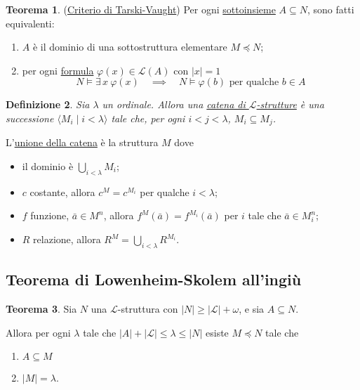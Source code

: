 \documentclass[10pt]{article}
\newcommand{\1}{\mathds{1}}
\theoremstyle{definition}%
\newtheorem{thm}{Teorema}[section]
\theoremstyle{plain}
\newtheorem{definizione}[thm]{Definizione}
\theoremstyle{remark}
\begin{document}
\begin{thm}
(\href{../../../../org/roam/20250212113245-criterio_di_tarski_vaught.org}{Criterio di Tarski-Vaught}) Per ogni \href{../../../../org/roam/20250131155822-operazioni_insiemistiche_tra_classi_mk.org}{sottoinsieme} \(A \subseteq N\), sono fatti equivalenti:
\begin{enumerate}
\item \(A\) è il dominio di una sottostruttura elementare \(M\preceq N\);
\item per ogni \href{../../../../org/roam/20250212102927-enunciato_con_parametri.org}{formula} \(\varphi(x) \in \mathcal{L}(A)\) con \(|x|=1\)
\begin{equation*}
 	N\vDash \exists\,x\ \varphi(x)\quad \implies\quad N\vDash \varphi(b)\text{ per qualche } b \in A
\end{equation*}
\end{enumerate}
\end{thm}

\begin{definizione}
Sia \(\lambda\) un ordinale. Allora una \uline{catena di \(\mathcal{L}\)-strutture} è una successione \(\langle M_{i}\mid i <\lambda\rangle\) tale che, per ogni \(i<j<\lambda\), \(M_{i} \subseteq M_{j}\).
\end{definizione}

L'\uline{unione della catena} è la struttura \(M\) dove
\begin{itemize}
\item il dominio è \(\bigcup_{i<\lambda} M_{i}\);
\item \(c\) costante, allora \(c^{M} =c^{M_{i}}\) per qualche \(i<\lambda\);
\item \(f\) funzione, \(\bar{a} \in M^{n}\), allora \(f^{M}(\bar{a}) = f^{M_{i}}(\bar{a})\) per \(i\) tale che \(\bar{a} \in M_{i}^{n}\);
\item \(R\) relazione, allora \(R^{M} = \bigcup_{i<\lambda} R^{M_{i}}\).
\end{itemize}
\subsection{Teorema di Lowenheim-Skolem all'ingiù}
\label{sec:orgfa89641}

\begin{thm}
Sia \(N\) una \(\mathcal{L}\)-struttura con \(|N|\ge |\mathcal{L}|+\omega\), e sia \(A \subseteq N\).

Allora per ogni \(\lambda\) tale che \(|A|+|\mathcal{L}|\le \lambda \le |N|\) esiste \(M\preceq N\) tale che
\begin{enumerate}
\item \(A \subseteq M\)
\item \(|M|=\lambda\).
\end{enumerate}
\end{thm}
\end{document}
